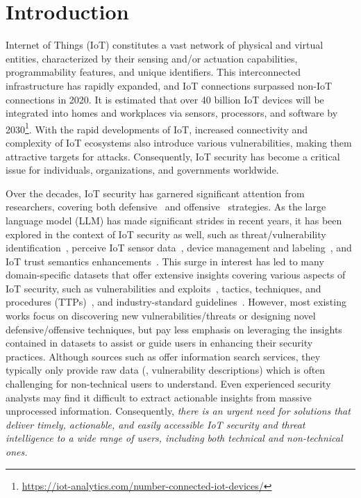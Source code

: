 \section{Introduction}\label{sec:intro}
Internet of Things (IoT) constitutes a vast network of physical and virtual entities, characterized by their sensing and/or actuation capabilities, programmability features, and unique identifiers. 
This interconnected infrastructure has rapidly expanded, and IoT connections surpassed non-IoT connections in 2020. 
It is estimated that over 40 billion IoT devices will be integrated into homes and workplaces via sensors, processors, and software by 2030\footnote{\scriptsize \url{https://iot-analytics.com/number-connected-iot-devices/}}.
With the rapid developments of IoT, increased connectivity and complexity of IoT ecosystems also introduce various vulnerabilities, making them attractive targets for attacks. 
Consequently, IoT security has become a critical issue for individuals, organizations, and governments worldwide.

Over the decades, IoT security has garnered significant attention from researchers, covering both defensive~\cite{kouicem2018internet,ahmad2021machine,williams2017identifying} and offensive~\cite{deogirikar2017security,gormucs2018security} strategies. 
As the large language model (LLM) has made significant strides in recent years, it has been explored in the context of IoT security as well, such as threat/vulnerability identification~\cite{sokiotllm,ma,llmiotfuz,yang2023iot}, perceive IoT sensor data~\cite{mo2024iot}, device management and labeling~\cite{meyuhas2024iotlabel,llmiotcontrol}, and IoT trust semantics enhancements~\cite{ferraris2024ici}.
This surge in interest has led to many domain-specific datasets that offer extensive insights covering various aspects of IoT security, such as vulnerabilities and exploits~\cite{CVE_Mission,VARIoT_db}, tactics, techniques, and procedures (TTPs)~\cite{strom2018mitre}, and industry-standard guidelines~\cite{abdul2019comprehensive,wright2022regulating}. 
However, most existing works focus on discovering new vulnerabilities/threats or designing novel defensive/offensive techniques, but pay less emphasis on leveraging the insights contained in datasets to assist or guide users in enhancing their security practices.
Although sources such as \cite{CVE_Mission,VARIoT_db,strom2018mitre} offer information search services, they typically only provide raw data (\eg, vulnerability descriptions) which is often challenging for non-technical users to understand. Even experienced security analysts may find it difficult to extract actionable insights from massive unprocessed information.
Consequently, \textit{there is an urgent need for solutions that deliver timely, actionable, and easily accessible IoT security and threat intelligence to a wide range of users, including both technical and non-technical ones.}


